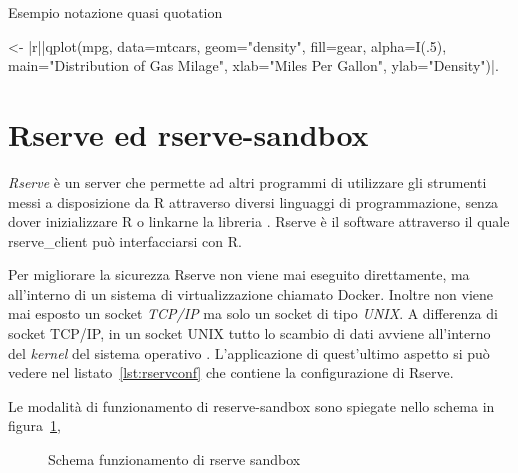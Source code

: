 \documentclass[10pt,titlepage,twoside,a4paper]{report}
\newenvironment{code}{\singlespacing\captionsetup{type=listing}}{}
\begin{document}
\begin{code}
    \caption{Esempio notazione quasi quotation}
    \label{lst:esempioquasiQuotation}
    \begin{prologcode*}{}
<- {|r||qplot(mpg, data=mtcars, geom="density", fill=gear, alpha=I(.5), main="Distribution of Gas Milage", xlab="Miles Per Gallon", ylab="Density")|}.
    \end{prologcode*}
\end{code}


\section{Rserve ed rserve-sandbox}

\emph{Rserve} è un server che permette ad altri programmi di
utilizzare gli strumenti messi a disposizione da R attraverso diversi
linguaggi di programmazione, senza dover inizializzare R o
linkarne la libreria \cite{rserve}. Rserve è il software attraverso il quale 
rserve\_client può interfacciarsi con R.

Per migliorare la sicurezza Rserve non 
viene mai eseguito direttamente, ma all'interno di un sistema di 
virtualizzazione chiamato Docker. Inoltre non viene mai esposto un socket 
\emph{TCP/IP} ma solo un socket di tipo \emph{UNIX}. A differenza di socket 
TCP/IP, in un socket UNIX tutto lo scambio di dati avviene all'interno del 
\emph{kernel} del sistema operativo \cite{unixSocket}. 
L'applicazione di quest'ultimo aspetto si può vedere nel 
listato~\ref{lst:rservconf} che contiene la configurazione di Rserve.

Le modalità di funzionamento di reserve-sandbox sono spiegate nello schema in 
figura~\ref{fig:rserveSandboxScheme}, 

\begin{figure}[H]
\centering
\caption{Schema funzionamento di rserve sandbox}
\label{fig:rserveSandboxScheme}
\end{figure}
\end{document}

